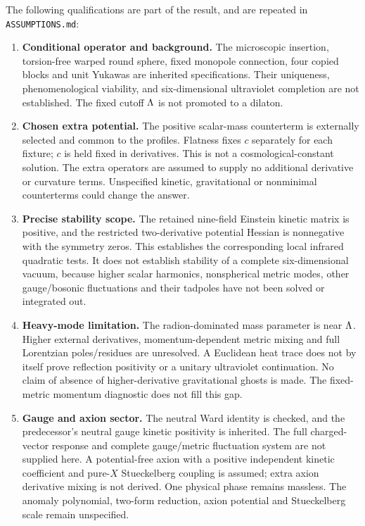 The following qualifications are part of the result, and are repeated in \texttt{ASSUMPTIONS.md}:
\begin{enumerate}
 \item \textbf{Conditional operator and background.} The microscopic insertion, torsion-free warped round sphere, fixed monopole connection, four copied blocks and unit Yukawas are inherited specifications. Their uniqueness, phenomenological viability, and six-dimensional ultraviolet completion are not established. The fixed cutoff $\Lambda$ is not promoted to a dilaton.
 \item \textbf{Chosen extra potential.} The positive scalar-mass counterterm is externally selected and common to the profiles. Flatness fixes $c$ separately for each fixture; $c$ is held fixed in derivatives. This is not a cosmological-constant solution. The extra operators are assumed to supply no additional derivative or curvature terms. Unspecified kinetic, gravitational or nonminimal counterterms could change the answer.
 \item \textbf{Precise stability scope.} The retained nine-field Einstein kinetic matrix is positive, and the restricted two-derivative potential Hessian is nonnegative with the symmetry zeros. This establishes the corresponding local infrared quadratic tests. It does not establish stability of a complete six-dimensional vacuum, because higher scalar harmonics, nonspherical metric modes, other gauge/bosonic fluctuations and their tadpoles have not been solved or integrated out.
 \item \textbf{Heavy-mode limitation.} The radion-dominated mass parameter is near $\Lambda$. Higher external derivatives, momentum-dependent metric mixing and full Lorentzian poles/residues are unresolved. A Euclidean heat trace does not by itself prove reflection positivity or a unitary ultraviolet continuation. No claim of absence of higher-derivative gravitational ghosts is made. The fixed-metric momentum diagnostic does not fill this gap.
 \item \textbf{Gauge and axion sector.} The neutral Ward identity is checked, and the predecessor's neutral gauge kinetic positivity is inherited. The full charged-vector response and complete gauge/metric fluctuation system are not supplied here. A potential-free axion with a positive independent kinetic coefficient and pure-$X$ Stueckelberg coupling is assumed; extra axion derivative mixing is not derived. One physical phase remains massless. The anomaly polynomial, two-form reduction, axion potential and Stueckelberg scale remain unspecified.

\end{enumerate}
